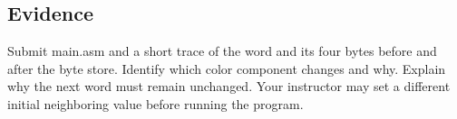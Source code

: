 \subsection{Evidence}\label{002-single-pixel-assignment-evidence}

Submit main.asm and a short trace of the word and its four bytes before
and after the byte store. Identify which color component changes and
why. Explain why the next word must remain unchanged. Your instructor
may set a different initial neighboring value before running the
program.
